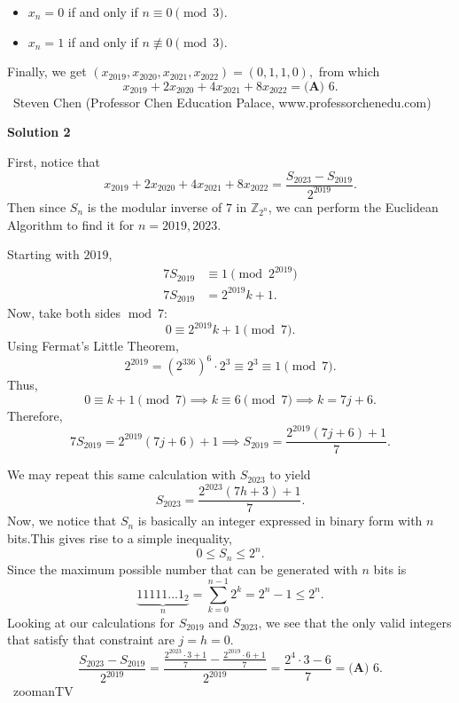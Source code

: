 \begin{enumerate}
 
            \begin{itemize}
        \item $x_n=0$ if and only if $n\equiv 0\pmod{3}.$
            \end{itemize}
            
            \begin{itemize}
        \item $x_n=1$ if and only if $n\not\equiv 0\pmod{3}.$
            \end{itemize}
            Finally, we get $(x_{2019},x_{2020},x_{2021},x_{2022})=(0,1,1,0),$ from which 
 \[x_{2019} + 2x_{2020} + 4x_{2021} + 8x_{2022} = \boxed{\textbf{(A) } 6}.\]~Steven Chen (Professor Chen Education Palace, www.professorchenedu.com)

 



\textbf{Solution 2}

First, notice that 
 \[x_{2019} + 2x_{2020} + 4x_{2021} + 8x_{2022} = \frac{S_{2023} - S_{2019}}{2^{2019}}.\]Then since $S_n$ is the modular inverse of $7$ in $\mathbb{Z}_{2^n}$, we can perform the Euclidean Algorithm to find it for $n = 2019,2023$.

 Starting with $2019$, 
 \begin{align*} 7S_{2019} &\equiv 1 \pmod{2^{2019}} \\ 7S_{2019} &= 2^{2019}k + 1. \end{align*}
Now, take both sides $\operatorname{mod} \ 7$:
 \[0 \equiv 2^{2019}k + 1 \pmod{7}.\]Using Fermat's Little Theorem, 
 \[2^{2019} = (2^{336})^6 \cdot 2^3 \equiv 2^3 \equiv 1 \pmod{7}.\]Thus,  
 \[0 \equiv k + 1 \pmod{7} \implies k \equiv 6 \pmod{7} \implies k = 7j + 6.\]Therefore, 
 \[7S_{2019} = 2^{2019} (7j + 6) + 1 \implies S_{2019} = \frac{2^{2019} (7j + 6) + 1}{7}.\]

 We may repeat this same calculation with $S_{2023}$ to yield 
 \[S_{2023} = \frac{2^{2023} (7h + 3) + 1}{7}.\]Now, we notice that $S_n$ is basically an integer expressed in binary form with $n$ bits.This gives rise to a simple inequality, 
 \[0 \leqslant S_n \leqslant 2^n.\]Since the maximum possible number that can be generated with $n$ bits is 
 \[\underbrace{{11111\dotsc1}_2}_{n} = \sum_{k=0}^{n-1} 2^k = 2^n - 1 \leqslant 2^n.\]Looking at our calculations for $S_{2019}$ and $S_{2023}$, we see that the only valid integers that satisfy that constraint are $j = h = 0$.
 \[\frac{S_{2023} - S_{2019}}{2^{2019}} = \frac{\frac{2^{2023} \cdot 3 + 1}{7} - \frac{2^{2019} \cdot 6 + 1}{7}}{2^{2019}} = \frac{2^4 \cdot 3 - 6}{7} = \boxed{\textbf{(A) } 6}.\]~zoomanTV


\end{enumerate}
